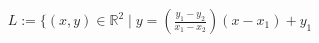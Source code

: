 \documentclass[preview]{standalone}
\begin{document}
\begin{align*}
L := \{ (x,y) \in \mathbb{R}^{2} \mid y = (\frac{y_{1}-y_{2}}{x_{1}-x_{2}}) (x-x_{1}) + y_{1}
\end{align*}
\end{document}
